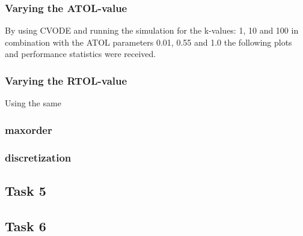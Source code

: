 \documentclass{article}
\begin{document}
      \subsubsection{Varying the ATOL-value}

        By using CVODE and running the simulation for the k-values: 1, 10 and 100
        in combination with the ATOL parameters 0.01, 0.55 and 1.0 the following
        plots and performance statistics were received.

        
        
        
%        

        

      \newpage
      \subsubsection{Varying the RTOL-value}

        Using the same

        
        
        
%        

        

      \subsubsection{maxorder}

        
        
        
        

      \subsubsection{discretization}

        
        
        

    \subsection{Task 5}
    \subsection{Task 6}

%    
%    
%    
\end{document}
